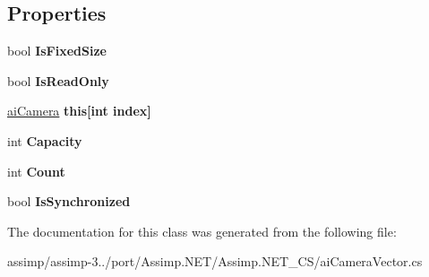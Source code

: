 \subsection*{Properties}
\begin{DoxyCompactItemize}
\item 
\hypertarget{classai_camera_vector_abbdb6ee8b645bc529b60c9be93e5dc96}{bool {\bfseries Is\+Fixed\+Size}}\label{classai_camera_vector_abbdb6ee8b645bc529b60c9be93e5dc96}

\item 
\hypertarget{classai_camera_vector_a8713e4310b99b37c43bda1495cef0c57}{bool {\bfseries Is\+Read\+Only}}\label{classai_camera_vector_a8713e4310b99b37c43bda1495cef0c57}

\item 
\hypertarget{classai_camera_vector_a245f3ef63df297bdb38101958f630ecc}{\hyperlink{structai_camera}{ai\+Camera} {\bfseries this\mbox{[}int index\mbox{]}}}\label{classai_camera_vector_a245f3ef63df297bdb38101958f630ecc}

\item 
\hypertarget{classai_camera_vector_a298870de6ab7817554bfab580341a5c7}{int {\bfseries Capacity}}\label{classai_camera_vector_a298870de6ab7817554bfab580341a5c7}

\item 
\hypertarget{classai_camera_vector_a1766a1b8f7e5481490e9ccad26821df5}{int {\bfseries Count}}\label{classai_camera_vector_a1766a1b8f7e5481490e9ccad26821df5}

\item 
\hypertarget{classai_camera_vector_ac18025ade93f05c6c95d3c177cd68c74}{bool {\bfseries Is\+Synchronized}}\label{classai_camera_vector_ac18025ade93f05c6c95d3c177cd68c74}

\end{DoxyCompactItemize}


The documentation for this class was generated from the following file\+:\begin{DoxyCompactItemize}
\item 
assimp/assimp-\/3../port/\+Assimp.\+N\+E\+T/\+Assimp.\+N\+E\+T\+\_\+\+C\+S/ai\+Camera\+Vector.\+cs\end{DoxyCompactItemize}
